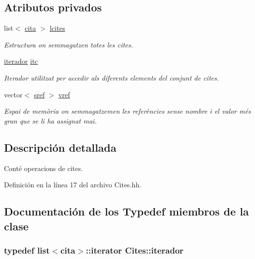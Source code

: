 \subsection*{Atributos privados}
\begin{DoxyCompactItemize}
\item 
list$<$ \hyperlink{struct_cites_1_1cita}{cita} $>$ \hyperlink{class_cites_a5bcd3b42706ea04fea35fe9db7f5838d}{lcites}
\begin{DoxyCompactList}\small\item\em Estructura on s\textquotesingle{}emmagatzen totes les cites. \end{DoxyCompactList}\item 
\hyperlink{class_cites_ae425e520dfe8c7271cb7465f450e8824}{iterador} \hyperlink{class_cites_a25951edde2ccf918aa4b2ad7ae6271fa}{itc}
\begin{DoxyCompactList}\small\item\em Iterador utilitzat per accedir als diferents elements del conjunt de cites. \end{DoxyCompactList}\item 
vector$<$ \hyperlink{struct_cites_1_1sref}{sref} $>$ \hyperlink{class_cites_acf50e611e8f49533071e82fd9ff9b55a}{vref}
\begin{DoxyCompactList}\small\item\em Espai de memòria on s\textquotesingle{}emmagatzemen les referències sense nombre i el valor més gran que se li ha assignat mai. \end{DoxyCompactList}\end{DoxyCompactItemize}


\subsection{Descripción detallada}
Conté operacions de cites. 

Definición en la línea 17 del archivo Cites.\+hh.



\subsection{Documentación de los \textquotesingle{}Typedef\textquotesingle{} miembros de la clase}
\subsubsection[{\texorpdfstring{iterador}{iterador}}]{\setlength{\rightskip}{0pt plus 5cm}typedef list$<${\bf cita}$>$\+::iterator {\bf Cites\+::iterador}\hspace{0.3cm}{\ttfamily [private]}}\hypertarget{class_cites_ae425e520dfe8c7271cb7465f450e8824}{}\label{class_cites_ae425e520dfe8c7271cb7465f450e8824}


